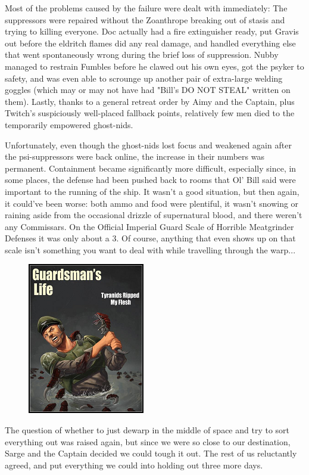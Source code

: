 Most of the problems caused by the failure were dealt with immediately: 
The suppressors were repaired without the Zoanthrope breaking out of stasis and trying to killing everyone. 
Doc actually had a fire extinguisher ready, put Gravis out before the eldritch flames did any real damage, and handled everything else that went spontaneously wrong during the brief loss of suppression. 
Nubby managed to restrain Fumbles before he clawed out his own eyes, got the psyker to safety, and was even able to scrounge up another pair of extra-large welding goggles (which may or may not have had "Bill's DO NOT STEAL" written on them). 
Lastly, thanks to a general retreat order by Aimy and the Captain, plus Twitch's suspiciously well-placed fallback points, relatively few men died to the temporarily empowered ghost-nids. 


Unfortunately, even though the ghost-nids lost focus and weakened again after the psi-suppressors were back online, the increase in their numbers was permanent. 
Containment became significantly more difficult, especially since, in some places, the defense had been pushed back to rooms that Ol' Bill said were important to the running of the ship. 
It wasn't a good situation, but then again, it could've been worse: 
both ammo and food were plentiful, it wasn't snowing or raining aside from the occasional drizzle of supernatural blood, and there weren't any Commissars. 
On the Official Imperial Guard Scale of Horrible Meatgrinder Defenses it was only about a 3. 
Of course, anything that even shows up on that scale isn't something you want to deal with while travelling through the warp...

\begin{figure}
	\begin{center}
		\includegraphics[width=\figwidth]{pics/15/19.png}
	\end{center}
\end{figure}
The question of whether to just dewarp in the middle of space and try to sort everything out was raised again, but since we were so close to our destination, Sarge and the Captain decided we could tough it out. 
The rest of us reluctantly agreed, and put everything we could into holding out three more days.

